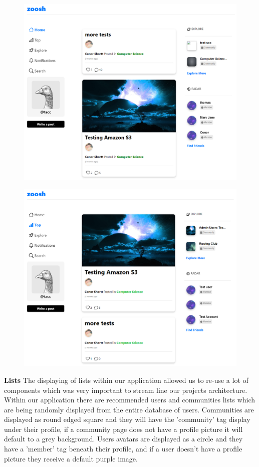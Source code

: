 \begin{figure}[H]
  \centering
  \includegraphics[scale=0.30]{img/screen2.PNG}
  \label{fig:Following Feed.}
\end{figure}

\begin{figure}[H]
  \centering
  \includegraphics[scale=0.30]{img/screen1.PNG}
  \label{fig:Top Posts Feed.}
\end{figure}

\newpage
\textbf{Lists}
\newline
The displaying of lists within our application allowed us to re-use a lot of components which was very important to stream line our projects architecture. Within our application there are recommended users and communities lists which are being randomly displayed from the entire database of users. Communities are displayed as round edged square and they will have the 'community' tag display under their profile, if a community page does not have a profile picture it will default to a grey background. Users avatars are displayed as a circle and they have a 'member' tag beneath their profile, and if a user doesn't have a profile picture they receive a default purple image.

